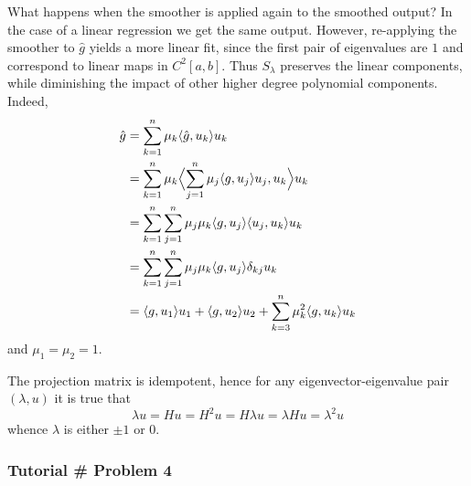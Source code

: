 \documentclass[a4paper]{article}
\begin{document}


What happens when the smoother is applied again to the smoothed output? In the
case of a linear regression we get the same output. However, re-applying the smoother
to $\hat{g}$ yields a more linear fit, since the first pair of eigenvalues are $1$
and correspond to linear maps in $C^2[a,b]$. Thus $S_\lambda$ preserves the linear
components, while diminishing the impact of other higher degree polynomial components.
Indeed,
\begin{align*}
	\hat{g} & = \sum_{k=1}^n \mu_k \langle\hat{g}, u_k\rangle u_k \\
	& = \sum_{k=1}^n \mu_k \Bigl\langle \sum_{j=1}^n \mu_j \langle g, u_j\rangle u_j, u_k\Bigr\rangle u_k \\
	& = \sum_{k=1}^n \sum_{j=1}^n \mu_j \mu_k \langle g, u_j\rangle \langle u_j, u_k\rangle u_k \\
	& = \sum_{k=1}^n \sum_{j=1}^n \mu_j \mu_k \langle g, u_j\rangle \delta_{kj} u_k \\
	& = \langle g, u_1\rangle u_1 + \langle g, u_2\rangle u_2
		+ \sum_{k=3}^n \mu_k^2 \langle g, u_k\rangle u_k
\end{align*}
and $\mu_1 = \mu_2 = 1$.

The projection matrix is idempotent, hence for any eigenvector-eigenvalue pair
$(\lambda, u)$ it is true that 
\[
\lambda u
= H u
= H^2 u
= H \lambda u
= \lambda H u
= \lambda^2 u
\]
whence $\lambda$ is either $\pm 1$ or $0$.

\subsubsection{Tutorial \# Problem 4} %
\label{ssub:tutorial_problem_4}
\end{document}
